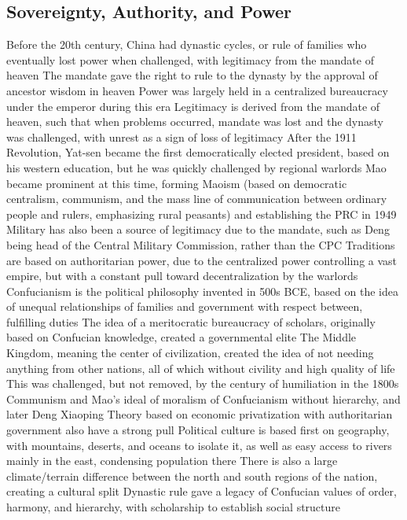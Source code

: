 \documentclass[11 pt, twoside]{article}
\newenvironment{outline*}
{
	\begin{outline}[enumerate]
	}
	{\end{outline}
}
\begin{document}
\subsection{Sovereignty, Authority, and Power}
\begin{outline*}
\1 Before the 20th century, China had dynastic cycles, or rule of families who eventually lost power when challenged, with legitimacy from the mandate of heaven
\2 The mandate gave the right to rule to the dynasty by the approval of ancestor wisdom in heaven
\2 Power was largely held in a centralized bureaucracy under the emperor during this era
\1 Legitimacy is derived from the mandate of heaven, such that when problems occurred, mandate was lost and the dynasty was challenged, with unrest as a sign of loss of legitimacy
\2 After the 1911 Revolution, Yat-sen became the first democratically elected president, based on his western education, but he was quickly challenged by regional warlords
\2 Mao became prominent at this time, forming Maoism (based on democratic centralism, communism, and the mass line of communication between ordinary people and rulers, emphasizing rural peasants) and establishing the PRC in 1949
\2 Military has also been a source of legitimacy due to the mandate, such as Deng being head of the Central Military Commission, rather than the CPC
\1 Traditions are based on authoritarian power, due to the centralized power controlling a vast empire, but with a constant pull toward decentralization by the warlords
\2 Confucianism is the political philosophy invented in 500s BCE, based on the idea of unequal relationships of families and government with respect between, fulfilling duties
\2 The idea of a meritocratic bureaucracy of scholars, originally based on Confucian knowledge, created a governmental elite
\2 The Middle Kingdom, meaning the center of civilization, created the idea of not needing anything from other nations, all of which without civility and high quality of life
\3 This was challenged, but not removed, by the century of humiliation in the 1800s
\2 Communism and Mao's ideal of moralism of Confucianism without hierarchy, and later Deng Xiaoping Theory based on economic privatization with authoritarian government also have a strong pull
\1 Political culture is based first on geography, with mountains, deserts, and oceans to isolate it, as well as easy access to rivers mainly in the east, condensing population there
\2 There is also a large climate/terrain difference between the north and south regions of the nation, creating a cultural split
\2 Dynastic rule gave a legacy of Confucian values of order, harmony, and hierarchy, with scholarship to establish social structure

\end{outline*}
\end{document}
